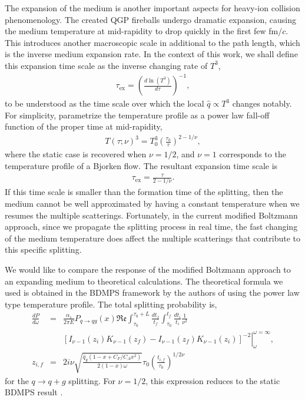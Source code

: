 The expansion of the medium is another important aspects for heavy-ion collision phenomenology.
The created QGP fireballs undergo dramatic expansion, causing the medium temperature at mid-rapidity to drop quickly in the first few fm$/c$.
This introduces another macroscopic scale in additional to the path length, which is the inverse medium expansion rate. 
In the context of this work, we shall define this expansion time scale as the inverse changing rate of $T^3$,
\begin{eqnarray}
\tau_{\textrm{ex}} = \left(\frac{d\ln(T^3)}{d \tau} \right)^{-1},
\end{eqnarray}
to be understood as the time scale over which the local $\hat{q}\propto T^3$ changes notably.
For simplicity, parametrize the temperature profile as a power law fall-off function of the proper time at mid-rapidity,
\begin{eqnarray}
T(\tau; \nu)^3 = T_0^3\left(\frac{\tau_0}{\tau}\right)^{2-1/\nu},
\end{eqnarray}
where the static case is recovered when $\nu=1/2$, and $\nu=1$ corresponds to the temperature profile of a Bjorken flow.
The resultant expansion time scale is
\begin{eqnarray}
\tau_{\textrm{ex}} = \frac{\tau}{2-1/\nu}.
\end{eqnarray}
If this time scale is smaller than the formation time of the splitting, then the medium cannot be well approximated by having a constant temperature when we resumes the multiple scatterings.
Fortunately, in the current modified Boltzmann approach, since we propagate the splitting process in real time, the fast changing of the medium temperature does affect the multiple scatterings that contribute to this specific splitting.

We would like to compare the response of the modified Boltzmann approach to an expanding medium to theoretical calculations.
The theoretical formula we used is obtained in the BDMPS framework 
by the authors of \cite{Baier:1998yf} using the power law type temperature profile. 
The total splitting probability is,
\begin{eqnarray}
\frac{dP}{d\omega} &=& \frac{\alpha_s}{2\pi E}P_{q\rightarrow qg}(x)\mathfrak{Re}\int_{\tau_0}^{\tau_0+L}\frac{dt_f}{t_f}\int_{\tau_0}^{t_f}\frac{dt_i}{t_i} \frac{1}{\nu^2}\\
\nonumber
&& \left.\left[ I_{\nu-1}(z_i)K_{\nu-1}(z_f)-I_{\nu-1}(z_f)K_{\nu-1}(z_i)\right]^{-2}\right|_{\omega}^{\omega=\infty},\\
z_{i,f} &=& 2i\nu \sqrt{\frac{\hat{q}_g(1-x+C_F/C_A x^2)}{2(1-x)\omega}} \tau_0 \left( \frac{t_{i,f}}{\tau_0}\right) ^{1/2\nu}
\end{eqnarray}
for the $q\rightarrow q+g$ splitting.
For $\nu=1/2$, this expression reduces to the static BDMPS result \cite{Baier:1996kr}. 

